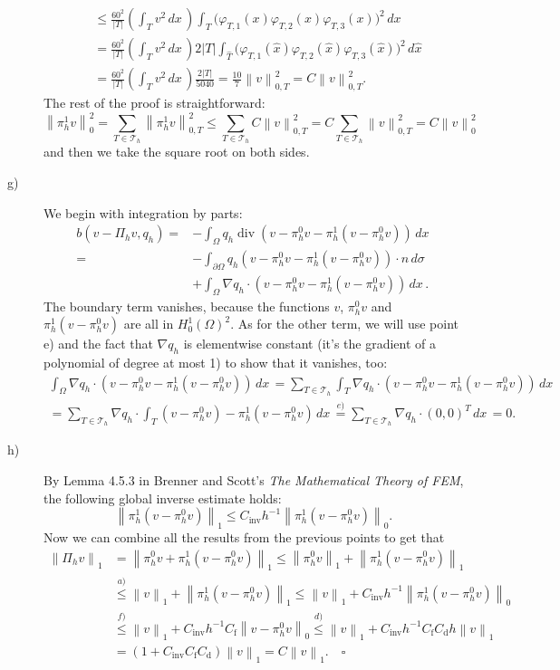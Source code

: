 \documentclass[a4paper]{article}
\DeclareMathOperator{\diver}{div}
\newcommand{\dx}{\, dx \,}
\newcommand{\dsigma}{\, d\sigma \,}
\newcommand{\area}[1]{\left\lvert #1 \right\rvert}
\newcommand{\norm}[1]{\left\lVert #1 \right\rVert}
\begin{document}
\begin{description}
\begin{align*}
&	\leq \frac{60^2}{\area{T}} \left( \int_{T} v^2 \dx \right)
		\int_T \big( \varphi_{T,1}(x) \varphi_{T,2}(x) \varphi_{T,3}(x) \big)^2 \dx \\
&	= \frac{60^2}{\area{T}} \left( \int_{T} v^2 \dx \right)
		2 \area{T} \int_{\hat{T}} \big( \varphi_{T,1}(\hat{x})
		\varphi_{T,2}(\hat{x}) \varphi_{T,3}(\hat{x}) \big)^2 \, d\hat{x} \, \\
&	= \frac{60^2}{\area{T}} \left( \int_{T} v^2 \dx \right) \frac{2\area{T}}{5040}
	= \frac{10}{7} \norm{v}_{0,T}^2
	= C \norm{v}_{0,T}^2.
	\end{align*}
	The rest of the proof is straightforward:
	\[
	\norm{\pi_h^1v}_0^2
	= \sum_{T \in \mathcal{T}_h} \norm{\pi_h^1v}_{0,T}^2
	\leq \sum_{T \in \mathcal{T}_h} C \norm{v}_{0,T}^2
	= C \sum_{T \in \mathcal{T}_h} \norm{v}_{0,T}^2
	= C \norm{v}_0^2
	\]
	and then we take the square root on both sides.
\item[g)] We begin with integration by parts:
	\begin{align*}
	b(v-\Pi_h v, q_h)
	= &- \int_\Omega q_h \diver(v-\pi_h^0v-\pi_h^1(v-\pi_h^0v)) \dx \\
	= &- \int_{\partial\Omega} q_h (v-\pi_h^0v-\pi_h^1(v-\pi_h^0v)) \cdot n \dsigma \\
	  &+ \int_\Omega \nabla q_h \cdot (v-\pi_h^0v-\pi_h^1(v-\pi_h^0v)) \dx.
	\end{align*}
	The boundary term vanishes, because the functions $v$, $\pi_h^0v$
	and $\pi_h^1(v-\pi_h^0v)$ are all in $H_0^1(\Omega)^2$.
	As for the other term, we will use point e) and the fact that
	$\nabla q_h$ is elementwise constant (it's the gradient of a polynomial
	of degree at most 1) to show that it vanishes, too:
	\begin{gather*}
	\int_\Omega \nabla q_h \cdot (v-\pi_h^0v-\pi_h^1(v-\pi_h^0v)) \dx
	= \sum_{T \in \mathcal{T}_h} \int_T \nabla q_h
		\cdot (v-\pi_h^0v-\pi_h^1(v-\pi_h^0v)) \dx \\
	= \sum_{T \in \mathcal{T}_h} \nabla q_h
		\cdot \int_T (v-\pi_h^0v)-\pi_h^1(v-\pi_h^0v) \dx
	\stackrel{e)}{=} \sum_{T \in \mathcal{T}_h} \nabla q_h
		\cdot (0,0)^T \dx
	= 0.
	\end{gather*}
\item[h)] By Lemma 4.5.3 in Brenner and Scott's \emph{The Mathematical Theory of FEM},
	the following global inverse estimate holds:
	\[
	\norm{\pi_h^1(v-\pi_h^0v)}_1 \leq C_\text{inv} h^{-1} \norm{\pi_h^1(v-\pi_h^0v)}_0.
	\]
	Now we can combine all the results from the previous points to get that
	\begin{align*}
	\norm{\Pi_h v}_1
&	= \norm{\pi_h^0 v + \pi_h^1(v-\pi_h^0v)}_1
	\leq \norm{\pi_h^0 v}_1 + \norm{\pi_h^1(v-\pi_h^0v)}_1 \\
&	\overset{a)}{\leq} \norm{v}_1 + \norm{\pi_h^1(v-\pi_h^0v)}_1
	\leq \norm{v}_1 + C_\text{inv} h^{-1} \norm{\pi_h^1(v-\pi_h^0v)}_0 \\
&	\overset{f)}{\leq} \norm{v}_1 + C_\text{inv} h^{-1} C_\text{f} \norm{v-\pi_h^0v}_0
	\overset{d)}{\leq} \norm{v}_1 + C_\text{inv} h^{-1} C_\text{f} C_\text{d} h \norm{v}_1 \\
&	= (1 + C_\text{inv} C_\text{f} C_\text{d}) \norm{v}_1
	= C \norm{v}_1. \quad \square
	\end{align*}
\end{description}
\end{document}
